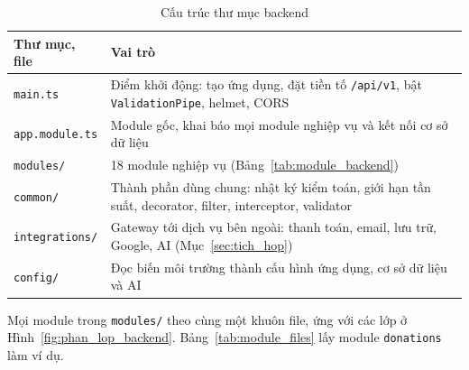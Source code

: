 \begin{table}[htbp]
    \centering
    \small
    \caption{Cấu trúc thư mục backend}
    \label{tab:backend_dir}
    \begin{tabularx}{\textwidth}{|P{3.6cm}|X|}
        \hline
        \textbf{Thư mục, file} & \textbf{Vai trò} \\
        \hline
        \texttt{main.ts} & Điểm khởi động: tạo ứng dụng, đặt tiền tố \texttt{/api/v1}, bật \texttt{ValidationPipe}, helmet, CORS \\
        \hline
        \texttt{app.module.ts} & Module gốc, khai báo mọi module nghiệp vụ và kết nối cơ sở dữ liệu \\
        \hline
        \texttt{modules/} & 18 module nghiệp vụ (Bảng~\ref{tab:module_backend}) \\
        \hline
        \texttt{common/} & Thành phần dùng chung: nhật ký kiểm toán, giới hạn tần suất, decorator, filter, interceptor, validator \\
        \hline
        \texttt{integrations/} & Gateway tới dịch vụ bên ngoài: thanh toán, email, lưu trữ, Google, AI (Mục~\ref{sec:tich_hop}) \\
        \hline
        \texttt{config/} & Đọc biến môi trường thành cấu hình ứng dụng, cơ sở dữ liệu và AI \\
        \hline
    \end{tabularx}
\end{table}

Mọi module trong \texttt{modules/} theo cùng một khuôn file, ứng với các lớp ở Hình~\ref{fig:phan_lop_backend}. Bảng~\ref{tab:module_files} lấy module \texttt{donations} làm ví dụ.

